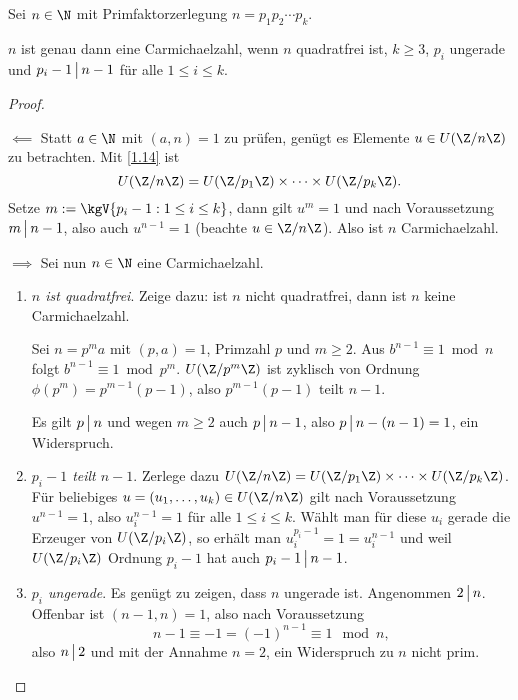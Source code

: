 \begin{st}[Korselt, 1899] \label{3.8}
	Sei $n \in \N$ mit Primfaktorzerlegung $n = p_1 p_2 \dotsb p_k$.

	$n$ ist genau dann eine Carmichaelzahl, wenn $n$ quadratfrei ist, $k \ge 3$, $p_i$ ungerade und $p_i-1 \divs n-1$ für alle $1 \le i \le k$.
	\begin{proof}
		\begin{segnb}{$\impliedby$}
			Statt $a \in \N$ mit $(a, n) = 1$ zu prüfen, genügt es Elemente $u \in U(\Z / n\Z)$ zu betrachten.
			Mit \ref{1.14} ist
			\[
				U(\Z / n\Z) = U(\Z / p_1\Z) \times \dotsb \times U(\Z / p_k \Z).
			\]
			Setze $m := \kgV \{ p_i - 1 : 1 \le i \le k \}$, dann gilt $u^m = 1$ und nach Voraussetzung $m \divs n - 1$, also auch $u^{n-1} = 1$ (beachte $u \in \Z / n\Z$).
			Also ist $n$ Carmichaelzahl.
		\end{segnb}
		\begin{segnb}{$\implies$}
			Sei nun $n \in \N$ eine Carmichaelzahl.
			\begin{enumerate}[1.]
				\item
					\emph{$n$ ist  quadratfrei}.
					Zeige dazu: ist $n$ nicht quadratfrei, dann ist $n$ keine Carmichaelzahl.

					Sei $n = p^m a$ mit $(p,a) = 1$, Primzahl $p$ und $m \ge 2$.
					Aus $b^{n-1} \equiv 1 \bmod n$ folgt $b^{n-1} \equiv 1 \bmod p^m$.
					$U(\Z / p^m \Z)$ ist zyklisch von Ordnung $\phi(p^m) = p^{m-1} (p-1)$, also $p^{m-1} (p-1)$ teilt $n-1$.

					Es gilt $p \divs n$ und wegen $m \ge 2$ auch $p \divs n-1$, also $p \divs n - (n-1) = 1$, ein Widerspruch.
				\item
					\emph{$p_i - 1$ teilt $n - 1$}.
					Zerlege dazu $U(\Z / n\Z) = U(\Z / p_1 \Z) \times \dotsb \times U(\Z / p_k \Z)$.
					Für beliebiges $u = (u_1, \dotsc, u_k) \in U(\Z / n\Z)$ gilt nach Voraussetzung $u^{n-1} = 1$, also $u_i^{n-1} = 1$ für alle $1 \le i \le k$.
					Wählt man für diese $u_i$ gerade die Erzeuger von $U(\Z / p_i\Z)$, so erhält man $u_i^{p_i-1} = 1 = u_i^{n-1}$ und weil $U(\Z / p_i \Z)$ Ordnung $p_i - 1$ hat auch $p_i - 1 \divs n - 1$.
				\item
					\emph{$p_i$ ungerade}.
					Es genügt zu zeigen, dass $n$ ungerade ist.
					Angenommen $2 \divs n$.
					Offenbar ist $(n - 1, n) = 1$, also nach Voraussetzung
					\[
						n - 1 \equiv -1 = (-1)^{n-1} \equiv 1 \mod n,
					\]
					also $n \divs 2$ und mit der Annahme $n = 2$, ein Widerspruch zu $n$ nicht prim.
			\end{enumerate}
		\end{segnb}
	\end{proof}
\end{st}

